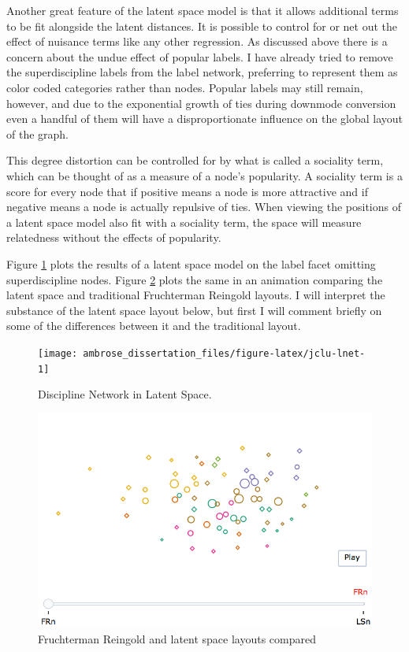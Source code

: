 \documentclass[]{book}
\theoremstyle{definition}
\theoremstyle{definition}
\theoremstyle{definition}
\theoremstyle{remark}
\begin{document}
Another great feature of the latent space model is that it allows
additional terms to be fit alongside the latent distances. It is
possible to control for or net out the effect of nuisance terms like any
other regression. As discussed above there is a concern about the undue
effect of popular labels. I have already tried to remove the
superdiscipline labels from the label network, preferring to represent
them as color coded categories rather than nodes. Popular labels may
still remain, however, and due to the exponential growth of ties during
downmode conversion even a handful of them will have a disproportionate
influence on the global layout of the graph.

This degree distortion can be controlled for by what is called a
sociality term, which can be thought of as a measure of a node's
popularity. A sociality term is a score for every node that if positive
means a node is more attractive and if negative means a node is actually
repulsive of ties. When viewing the positions of a latent space model
also fit with a sociality term, the space will measure relatedness
without the effects of popularity.

Figure \ref{fig:jclu-lnet} plots the results of a latent space model on
the label facet omitting superdiscipline nodes. Figure \ref{fig:layouts}
plots the same in an animation comparing the latent space and
traditional Fruchterman Reingold layouts. I will interpret the substance
of the latent space layout below, but first I will comment briefly on
some of the differences between it and the traditional layout.

\begin{figure}

{\centering \texttt{[image: ambrose\_dissertation\_files/figure-latex/jclu-lnet-1]} 

}

\caption{Discipline Network in Latent Space.}\label{fig:jclu-lnet}
\end{figure}

\begin{figure}

{\centering \includegraphics[width=0.9\linewidth]{img/layouts} 

}

\caption{Fruchterman Reingold and latent space layouts compared}\label{fig:layouts}
\end{figure}
\end{document}
